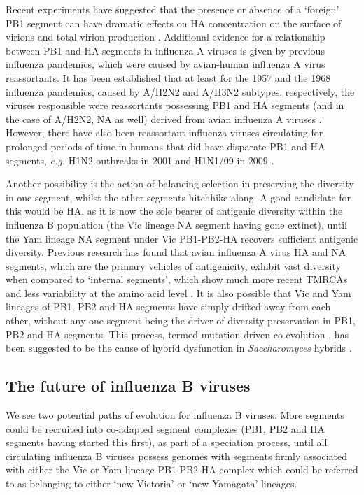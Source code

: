 \documentclass[11pt,oneside,letterpaper]{article}
\begin{document}
Recent experiments have suggested that the presence or absence of a `foreign' PB1 segment can have dramatic effects on HA concentration on the surface of virions and total virion production \cite{cobbin2013}.
Additional evidence for a relationship between PB1 and HA segments in influenza A viruses is given by previous influenza pandemics, which were caused by avian-human influenza A virus reassortants.
It has been established that at least for the 1957 and the 1968 influenza pandemics, caused by A/H2N2 and A/H3N2 subtypes, respectively, the viruses responsible were reassortants possessing PB1 and HA segments (and in the case of A/H2N2, NA as well) derived from avian influenza A viruses \cite{kawaoka1989}.
However, there have also been reassortant influenza viruses circulating for prolonged periods of time in humans that did have disparate PB1 and HA segments, \textit{e.g.} H1N2 outbreaks in 2001 \cite{gregory2002} and H1N1/09 in 2009 \cite{smith2009}.


Another possibility is the action of balancing selection in preserving the diversity in one segment, whilst the other segments hitchhike along.
A good candidate for this would be HA, as it is now the sole bearer of antigenic diversity within the influenza B population (the Vic lineage NA segment having gone extinct), until the Yam lineage NA segment under Vic PB1-PB2-HA recovers sufficient antigenic diversity.
Previous research has found that avian influenza A virus HA and NA segments, which are the primary vehicles of antigenicity, exhibit vast diversity when compared to `internal segments', which show much more recent TMRCAs and less variability at the amino acid level \cite{chen2006,obenauer2006}.
It is also possible that Vic and Yam lineages of PB1, PB2 and HA segments have simply drifted away from each other, without any one segment being the driver of diversity preservation in PB1, PB2 and HA segments.
This process, termed mutation-driven co-evolution \cite{presgraves2010}, has been suggested to be the cause of hybrid dysfunction in \textit{Saccharomyces} hybrids \cite{lee2008}.

\subsection*{The future of influenza B viruses}
We see two potential paths of evolution for influenza B viruses.
More segments could be recruited into co-adapted segment complexes (PB1, PB2 and HA segments having started this first), as part of a speciation process, until all circulating influenza B viruses possess genomes with segments firmly associated with either the Vic or Yam lineage PB1-PB2-HA complex which could be referred to as belonging to either `new Victoria' or `new Yamagata' lineages.
\end{document}
